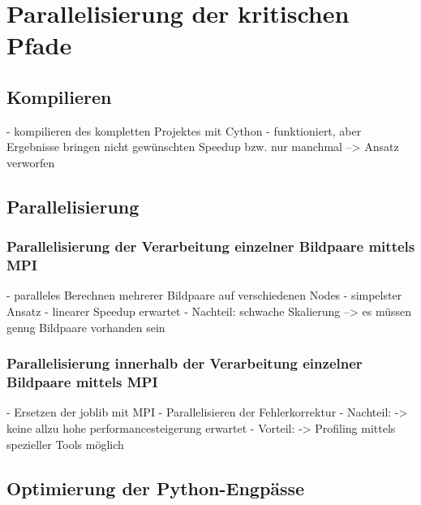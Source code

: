 \chapter{Parallelisierung der kritischen Pfade}


\section{Kompilieren}

\begin{correctmore}
	- kompilieren des kompletten Projektes mit Cython
	- funktioniert, aber Ergebnisse bringen nicht gewünschten Speedup bzw. nur manchmal
	--> Ansatz verworfen
\end{correctmore}

\section{Parallelisierung}

\subsection{Parallelisierung der Verarbeitung einzelner Bildpaare mittels MPI}

\begin{correctmore}
	- paralleles Berechnen mehrerer Bildpaare auf verschiedenen Nodes
	- simpelster Ansatz
	- linearer Speedup erwartet
	- Nachteil: schwache Skalierung --> es müssen genug Bildpaare vorhanden sein
\end{correctmore}

\subsection{Parallelisierung innerhalb der Verarbeitung einzelner Bildpaare mittels MPI}

\begin{correctmore}
	- Ersetzen der joblib mit MPI
	- Parallelisieren der Fehlerkorrektur
	- Nachteil:
		-> keine allzu hohe performancesteigerung erwartet
	- Vorteil:
		-> Profiling mittels spezieller Tools möglich
\end{correctmore}

\section{Optimierung der Python-Engpässe}

